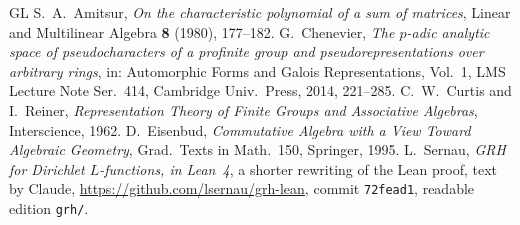 \documentclass[reqno]{amsart}
\theoremstyle{definition}
\theoremstyle{plain}
\begin{document}
{\small
\begin{thebibliography}{GL}
 S.~A.~Amitsur, \emph{On the characteristic polynomial of a sum of matrices}, Linear and Multilinear Algebra \textbf{8} (1980), 177--182.
 G.~Chenevier, \emph{The \(p\)-adic analytic space of pseudocharacters of a profinite group and pseudorepresentations over arbitrary rings}, in: Automorphic Forms and Galois Representations, Vol.~1, LMS Lecture Note Ser.\ 414, Cambridge Univ.\ Press, 2014, 221--285.
 C.~W.~Curtis and I.~Reiner, \emph{Representation Theory of Finite Groups and Associative Algebras}, Interscience, 1962.
 D.~Eisenbud, \emph{Commutative Algebra with a View Toward Algebraic Geometry}, Grad.\ Texts in Math.\ 150, Springer, 1995.
 L.~Sernau, \emph{GRH for Dirichlet \(L\)-functions, in Lean~4}, a shorter rewriting of the Lean proof, text by Claude, \url{https://github.com/lsernau/grh-lean}, commit \texttt{72fead1}, readable edition \texttt{grh/}.
\end{thebibliography}
}
\end{document}
